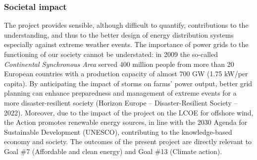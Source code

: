 \vspace{-2ex}\subsubsection*{Societal impact}\vspace{-1ex}
The project provides sensible, although difficult to quantify, contributions to the understanding, and thus to the better design of energy distribution systems especially against extreme weather events. The importance of power grids to the functioning of our society cannot be understated: in 2009 the so-called \emph{Continental Synchronous Area} served 400 million people from more than 20 European countries with a production capacity of almost 700 GW (1.75 kW/per capita). By anticipating the impact of storms on farms' power output, better grid planning can enhance preparedness and management of extreme events for a more disaster-resilient society (Horizon Europe – Disaster-Resilient Society – 2022). Moreover, due to the impact of the project on the LCOE for offshore wind, the Action promotes renewable energy sources, in line with the 2030 Agenda for Sustainable Development (UNESCO), contributing to the knowledge-based economy and society. The outcomes of the present project are directly relevant to Goal \#7 (Affordable and clean energy) and Goal \#13 (Climate action).




